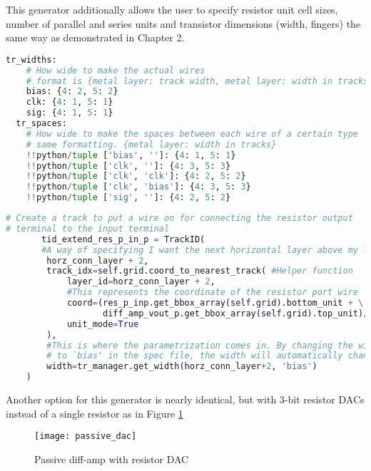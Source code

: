 This generator additionally allows the user to specify resistor unit cell sizes, number of parallel and series units and transistor dimensions (width, fingers) the same way as demonstrated in Chapter 2.
\begin{lstlisting}[language=Python, caption=Track manager setup, label={lst:tr_manager}, float]
tr_widths:
    # How wide to make the actual wires
    # format is {metal layer: track width, metal layer: width in tracks}
    bias: {4: 2, 5: 2}
    clk: {4: 1, 5: 1}
    sig: {4: 1, 5: 1}
  tr_spaces:
    # How wide to make the spaces between each wire of a certain type
    # same formatting. {metal layer: width in tracks}
    !!python/tuple ['bias', '']: {4: 1, 5: 1}
    !!python/tuple ['clk', '']: {4: 3, 5: 3}
    !!python/tuple ['clk', 'clk']: {4: 2, 5: 2}
    !!python/tuple ['clk', 'bias']: {4: 3, 5: 3}
    !!python/tuple ['sig', '']: {4: 2, 5: 2}
\end{lstlisting}
\begin{lstlisting}[language=Python, caption=Track manager usage, label={lst:wire_widths}, float]
# Create a track to put a wire on for connecting the resistor output
# terminal to the input terminal
       tid_extend_res_p_in_p = TrackID(
       #A way of specifying I want the next horizontal layer above my lowest horz. layer 
        horz_conn_layer + 2, 
        track_idx=self.grid.coord_to_nearest_track( #Helper function
            layer_id=horz_conn_layer + 2,
            #This represents the coordinate of the resistor port wire
            coord=(res_p_inp.get_bbox_array(self.grid).bottom_unit + \
                   diff_amp_vout_p.get_bbox_array(self.grid).top_unit)/2,
            unit_mode=True
        ),
        #This is where the parametrization comes in. By changing the width corresponding
        # to `bias' in the spec file, the width will automatically change here.
        width=tr_manager.get_width(horz_conn_layer+2, 'bias') 
    )
\end{lstlisting}

Another option for this generator is nearly identical, but with 3-bit resistor DACs instead of a single resistor as in Figure \ref{fig:passive_dac}
\begin{figure}[h]
\centering
\texttt{[image: passive\_dac]}
\caption{Passive diff-amp with resistor DAC}
\label{fig:passive_dac}
\end{figure}

